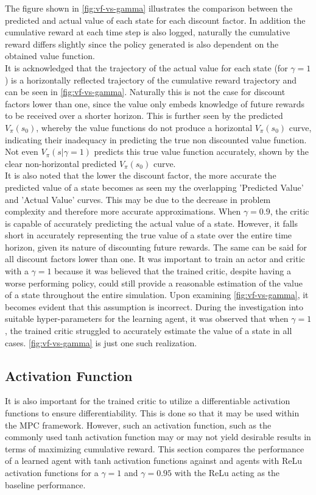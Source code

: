The figure shown in \autoref{fig:vf-vs-gamma}  illustrates the comparison between the predicted and actual value of each state for each discount factor. In addition the cumulative reward at each time step is also logged, naturally the cumulative reward differs slightly since the policy generated is also dependent on the obtained value function. \\
It is acknowledged that the trajectory of the actual value for each state  (for $\gamma = 1$) is a horizontally reflected trajectory of the cumulative reward trajectory and can be seen in \autoref{fig:vf-vs-gamma}. Naturally this is not the case for discount factors lower than one, since the value only embeds knowledge of future rewards to be received over a shorter horizon. This is further seen by the predicted $V_{\pi}(s_0)$, whereby the value functions do not produce a horizontal $V_{\pi}(s_0)$ curve, indicating their inadequacy in predicting the true non discounted value function. Not even $V_{\pi}(s|\gamma = 1)$ predicts this true value function accurately, shown by the clear non-horizontal predicted $V_{\pi}(s_0)$ curve.\\
It is also noted that the lower the discount factor, the more accurate the predicted value of a state becomes as seen my the overlapping 'Predicted Value' and 'Actual Value' curves. This may be due to the decrease in problem complexity and therefore more accurate approximations. When $\gamma = 0.9$, the critic is capable of accurately predicting the actual value of a state. However, it falls short in accurately representing the true value of a state over the entire time horizon, given its nature of discounting future rewards. The same can be said for all discount factors lower than one. It was important to train an actor and critic with a $\gamma = 1$ because it was believed that the trained critic, despite having a worse performing policy,  could still provide a reasonable estimation of the value of a state throughout the entire simulation. Upon examining \autoref{fig:vf-vs-gamma}, it becomes evident that this assumption is incorrect. During the investigation into suitable hyper-parameters for the learning agent, it was observed that when $\gamma = 1$, the trained critic struggled to accurately estimate the value of a state in all cases. \autoref{fig:vf-vs-gamma} is just one such realization. 

\subsection{Activation Function}
It is also important for the trained critic to utilize a differentiable activation functions to ensure differentiability. This is done so that it may be used within the MPC framework. However, such an activation function, such as the commonly used tanh activation function may or may not yield desirable results in terms of maximizing cumulative reward. This section compares the performance of a learned agent with tanh activation functions against and agents with ReLu activation functions for a $\gamma = 1$ and $\gamma = 0.95$ with the ReLu acting as the baseline performance. 


